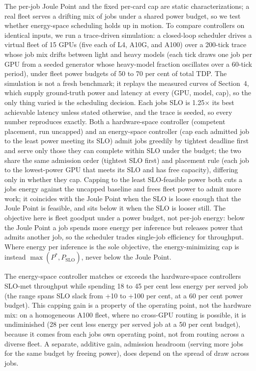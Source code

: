 The per-job Joule Point and the fixed per-card cap are static characterizations; a real fleet serves a
drifting mix of jobs under a shared power budget, so we test whether energy-space scheduling holds up in motion.
To compare controllers on identical inputs, we run a trace-driven simulation: a closed-loop scheduler drives a
virtual fleet of 15 GPUs (five each of L4, A10G, and A100) over a 200-tick trace whose job mix drifts between
light and heavy models (each tick draws one job per GPU from a seeded generator whose heavy-model fraction oscillates over a 60-tick period), under fleet power budgets of 50 to 70 per cent of total TDP. The simulation is not a
fresh benchmark; it replays the measured curves of Section~4, which supply ground-truth power and latency at
every (GPU, model, cap), so the only thing varied is the scheduling decision. Each job\textquotesingle s SLO is 1.25$\times$ its
best achievable latency unless stated otherwise, and the trace is seeded, so every number reproduces exactly.
Both a hardware-space controller (competent placement, run uncapped) and an energy-space controller (cap each
admitted job to the least power meeting its SLO) admit jobs greedily by tightest deadline first and serve only
those they can complete within SLO under the budget; the two share the same admission order (tightest SLO first) and placement rule (each job to the lowest-power GPU that meets its SLO and has free capacity),
differing only in whether they cap. Capping to the least SLO-feasible power both cuts a job\textquotesingle s energy against the
uncapped baseline and frees fleet power to admit more work; it coincides with the Joule Point when the SLO is
loose enough that the Joule Point is feasible, and sits below it when the SLO is looser still. The objective here
is fleet goodput under a power budget, not per-job energy: below the Joule Point a job spends more energy per
inference but releases power that admits another job, so the scheduler trades single-job efficiency for
throughput. Where energy per inference is the sole objective, the energy-minimizing cap is instead
{\(\max(P^{*},P_{\mathrm{SLO}})\)}, never below the Joule Point.

The energy-space controller matches or exceeds the hardware-space controller\textquotesingle s SLO-met throughput while
spending 18 to 45 per cent less energy per served job (the range spans SLO slack from +10 to
+100 per cent, at a 60 per cent power budget). This capping gain is a property of the operating point, not the
hardware mix: on a homogeneous A100 fleet, where no cross-GPU routing is possible, it is undiminished
(28 per cent less energy per served job at a 50 per cent budget), because it
comes from each job\textquotesingle s own operating point, not from routing across a diverse fleet. A separate, additive gain,
admission headroom (serving more jobs for the same budget by freeing power), does depend on the spread of draw
across jobs.

